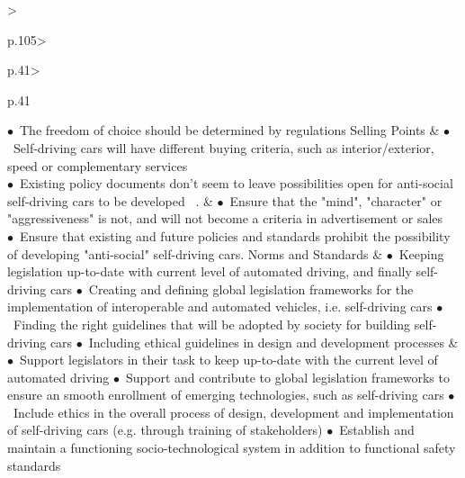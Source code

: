 \begin{table}[t]
\begin{small}
\begin{supertabular}{%
		>{\raggedright}p{.105\textwidth}>{\raggedright}p{.41\textwidth}>{\raggedright}p{.41\textwidth}}
				\noindent $\bullet$~The freedom of choice should be determined by regulations
 			 \tabularnewline \hline %
  			Selling Points & 
				\noindent $\bullet$~Self-driving cars will have different buying criteria, such as interior/exterior, speed or complementary services\\
				\noindent $\bullet$~Existing policy documents don't seem to leave possibilities open for anti-social self-driving cars to be developed~ \cite{EthicsCommission2017b,Pillath2016,NHTSA2016PolicyUpdate,DBLP:journals/corr/CharisiDFLMSSWY17}.
			& 
				\noindent $\bullet$~Ensure that the "mind", "character" or "aggressiveness" is not, and will not become a criteria in advertisement or sales \\
				\noindent $\bullet$~Ensure that existing and future policies and standards prohibit the possibility of developing "anti-social" self-driving cars.
 			 \tabularnewline \hline %
			Norms and Standards & 
				\noindent $\bullet$~Keeping legislation up-to-date with current level of automated driving, and finally self-driving cars 
                \noindent $\bullet$~Creating and defining global legislation frameworks for the implementation of interoperable and automated vehicles, i.e. self-driving cars
				\noindent $\bullet$~Finding the right guidelines that will be adopted by society for building self-driving cars
				\noindent $\bullet$~Including ethical guidelines in design and development processes
			& 
				\noindent $\bullet$~Support legislators in their task to keep up-to-date with the current level of automated driving
				\noindent $\bullet$~Support and contribute to global legislation frameworks to ensure an smooth enrollment of emerging technologies, such as self-driving cars
				\noindent $\bullet$~Include ethics in the overall process of design, development and implementation of self-driving cars \cite{Sapienza2016a, spiekermann2015ethical} (e.g. through training of stakeholders) 
				\noindent $\bullet$~Establish and maintain a functioning socio-technological system in addition to functional safety standards
 			 \tabularnewline %
			\bottomrule
		\end{supertabular}
	\end{small}
	
\end{table}

